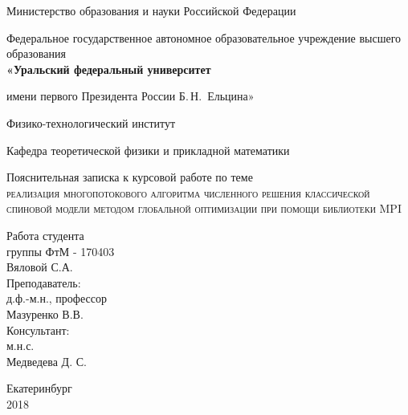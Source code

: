 \documentclass[14pt,a4paper,report]{ncc}
\begin{document}
\def\contentsname{Содержание}

\begin{titlepage}
\begin{center}
\vspace{5em}
\small Министерство образования и науки Российской Федерации

\small Федеральное государственное автономное образовательное учреждение высшего образования\\
\vspace{2em}
\normalsize \bf «Уральский федеральный университет

имени первого Президента России Б.\,Н.~Ельцина»

\bigskip
\vspace{1em}
\footnotesize \rm Физико-технологический институт

Кафедра теоретической физики и прикладной математики

\vspace{3em}
\large Пояснительная записка к курсовой работе по теме\\
\textsc{реализация многопотокового алгоритма численного решения классической спиновой модели методом глобальной оптимизации при помощи библиотеки MPI}\\
\end{center}
\vfill
\hfill

\begin{flushright}
\begin{minipage}{.5\textwidth}
Работа студента\\[1mm] 
группы ФтМ - 170403\\
Вяловой С.А.\\[5mm]

Преподаватель:\\[1mm] 
д.ф.-м.н., профессор\\
Мазуренко В.В.\\[5mm]

Консультант:\\[1mm] 
м.н.с.\\
Медведева Д. С.\\
\end{minipage}
\end{flushright}


\vfill
\begin{center}
Екатеринбург \\
2018
\end{center}
\end{titlepage}
\end{document}
